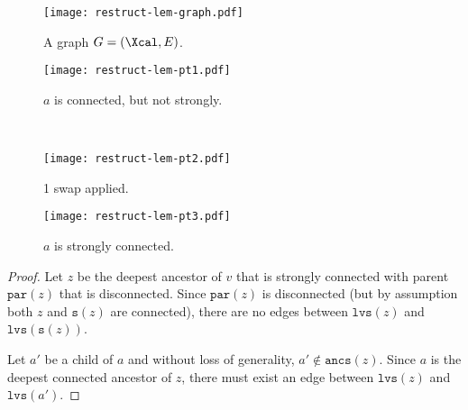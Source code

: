 \documentclass{article} \usepackage[utf8]{inputenc} \usepackage[T1]{fontenc}    \usepackage{hyperref}       \usepackage{url}            \usepackage{booktabs}       \usepackage{amsfonts}       \usepackage{nicefrac}       \usepackage{microtype}      \usepackage{geometry}
\newcommand{\rst}{\texttt{restruct}\xspace}
\newcommand{\lvs}[1]{\ensuremath{\texttt{lvs}(#1)}}
\newcommand{\ancs}[1]{\ensuremath{\texttt{ancs}(#1)}}
\newcommand{\sib}[1]{\ensuremath{\texttt{s}}(#1)\xspace}
\newcommand{\parent}[1]{\ensuremath{\texttt{par}}(#1)\xspace}
\begin{document}
\begin{appendix}
\begin{figure*}[h]
\captionsetup[subfigure]{justification=centering}
\centering
\begin{subfigure}[h]{0.49\textwidth}
  \centerline{\texttt{[image: restruct-lem-graph.pdf]}}
  \caption{A graph $G = (\Xcal, E)$.}
  \label{fig:restruct-lem-graph}
\end{subfigure}
\begin{subfigure}[h]{0.49\textwidth}
  \centerline{\texttt{[image: restruct-lem-pt1.pdf]}}
  \caption{$a$ is connected, but not strongly.}
  \label{fig:restruct-lem-pt1}
\end{subfigure}\\
\begin{subfigure}[h]{0.49\textwidth}
  \centerline{\texttt{[image: restruct-lem-pt2.pdf]}}
  \caption{1 swap applied.}
  \label{fig:restruct-lem-pt2}
\end{subfigure}
\begin{subfigure}[h]{0.49\textwidth}
  \centerline{\texttt{[image: restruct-lem-pt3.pdf]}}
  \caption{$a$ is strongly connected.}
  \label{fig:restruct-lem-pt3}
\end{subfigure}
\caption{The \rst method. As before, black-filled nodes are maximal,
  gray-filled nodes are strongly connected, nodes with no fill and
  solid borders are connected (but not strongly) and nodes with dashed
  borders are disconnected. Also, note that the labels $z, z',\ell$
  and $a'$ do not apply to the same nodes throughout all figures so to
  match their usage in proof. In Figure \ref{fig:restruct-lem-pt1},
  $z \triangleq v \triangleq x_5$.  $\sib{z}$ and $z'$ are swapped to
  produce the tree in Figure \ref{fig:restruct-lem-pt2}. Finally,
  $\sib{z}$ and $z'$ from Figure \ref{fig:restruct-lem-pt2} are
  swapped to produce the tree in Figure \ref{fig:restruct-lem-pt3},
  which is strongly connected.}
  \label{fig:restruct-lem}
\end{figure*}
 
\begin{proof}
Let $z$ be the deepest ancestor of $v$ that is strongly connected with
parent $\parent{z}$ that is disconnected. Since $\parent{z}$ is
disconnected (but by assumption both $z$ and $\sib{z}$ are connected),
there are no edges between \lvs{z} and \lvs{\sib{z}}.

Let $a'$ be a child of $a$ and without loss of generality, $a' \not\in
\ancs{z}$.  Since $a$ is the deepest connected ancestor of $z$, there
must exist an edge between \lvs{z} and \lvs{a'}.


\end{proof}
\end{appendix}
\end{document}
